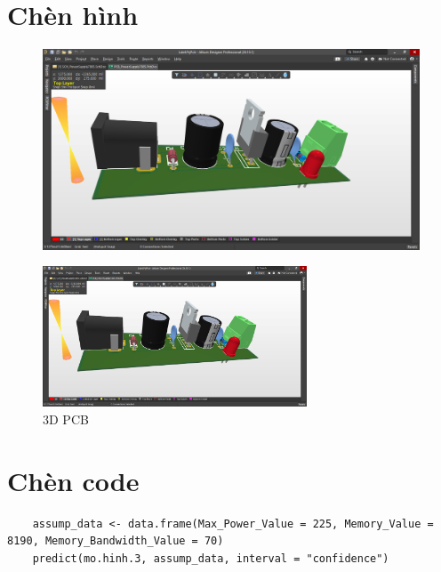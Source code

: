 \documentclass[twoside, final]{hcmut_report}
\begin{document}
\section{Chèn hình}
\begin{figure}[!htbp]
    \centering
    \includegraphics[width=1\textwidth]{graphics/f5.PNG}
    
\end{figure}
\begin{figure}[!htbp]
    \centering
    \includegraphics[width=0.7\textwidth]{graphics/f5.PNG}
    \caption{3D PCB}
\end{figure}

\section{Chèn code}
\begin{lstlisting}
    assump_data <- data.frame(Max_Power_Value = 225, Memory_Value = 8190, Memory_Bandwidth_Value = 70)
    predict(mo.hinh.3, assump_data, interval = "confidence")
\end{lstlisting}
\end{document}
